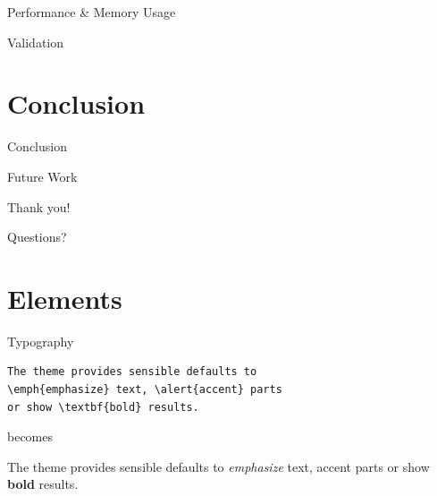 \documentclass[10pt]{beamer}
\begin{document}
\begin{frame}{Performance \& Memory Usage}
\end{frame}

\begin{frame}{Validation}
\end{frame}


\section{Conclusion}

{
\begin{frame}{Conclusion}
\end{frame}}

\begin{frame}{Future Work}
\end{frame}

\begin{frame}{}
  \begin{center}
    \LARGE Thank you!
  \end{center}
\end{frame}

\begin{frame}{}
  \begin{center}
    \LARGE Questions?
  \end{center}
\end{frame}


\section{Elements}

\begin{frame}[fragile]{Typography}
      \begin{verbatim}The theme provides sensible defaults to
\emph{emphasize} text, \alert{accent} parts
or show \textbf{bold} results.\end{verbatim}

  \begin{center}becomes\end{center}

  The theme provides sensible defaults to \emph{emphasize} text,
  \alert{accent} parts or show \textbf{bold} results.
\end{frame}
\end{document}
